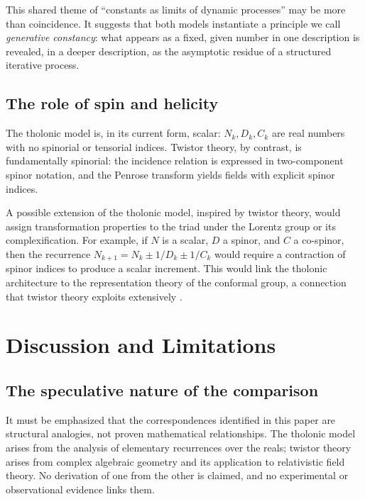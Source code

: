 \documentclass[12pt]{article}
\begin{document}
This shared theme of ``constants as limits of dynamic processes'' may be more than
coincidence.  It suggests that both models instantiate a principle we call
\emph{generative constancy}: what appears as a fixed, given number in one description
is revealed, in a deeper description, as the asymptotic residue of a structured
iterative process.

\subsection{The role of spin and helicity}\label{sec:spin}

The tholonic model is, in its current form, scalar: $N_k, D_k, C_k$ are real numbers
with no spinorial or tensorial indices.  Twistor theory, by contrast, is fundamentally
spinorial: the incidence relation is expressed in two-component spinor notation, and the
Penrose transform yields fields with explicit spinor indices.

A possible extension of the tholonic model, inspired by twistor theory, would assign
transformation properties to the triad under the Lorentz group or its complexification.
For example, if $N$ is a scalar, $D$ a spinor, and $C$ a co-spinor, then the recurrence
$N_{k+1} = N_k \pm 1/D_k \pm 1/C_k$ would require a contraction of spinor indices to
produce a scalar increment.  This would link the tholonic architecture to the
representation theory of the conformal group, a connection that twistor theory exploits
extensively \cite{BE89}.

\section{Discussion and Limitations}\label{sec:discussion}

\subsection{The speculative nature of the comparison}\label{sec:speculative}

It must be emphasized that the correspondences identified in this paper are structural
analogies, not proven mathematical relationships.  The tholonic model arises from the
analysis of elementary recurrences over the reals; twistor theory arises from complex
algebraic geometry and its application to relativistic field theory.  No derivation of
one from the other is claimed, and no experimental or observational evidence links them.
\end{document}
